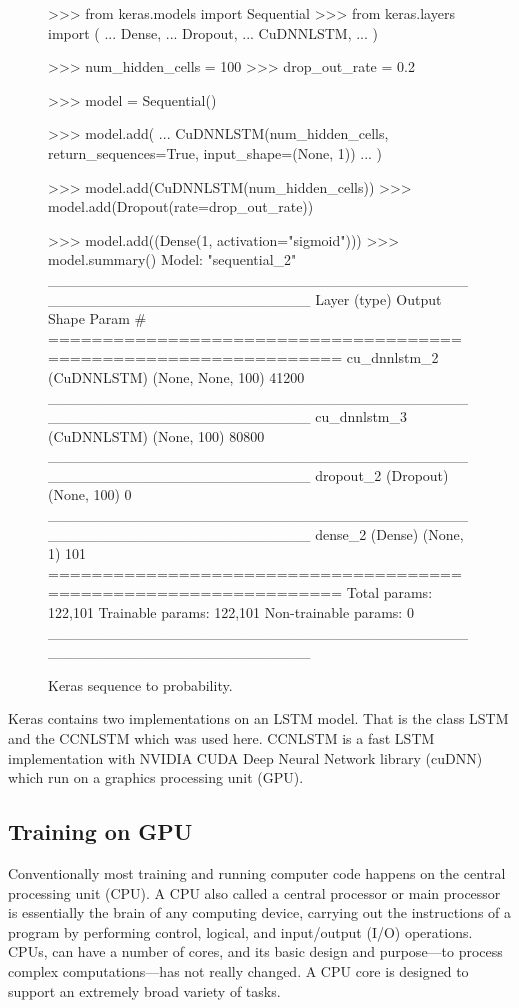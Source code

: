 \begin{figure}[!htbp]
\begin{usagepy}
    >>> from keras.models import Sequential
>>> from keras.layers import (
...     Dense,
...     Dropout,
...     CuDNNLSTM,
... )

>>> num_hidden_cells = 100
>>> drop_out_rate = 0.2

>>> model = Sequential()

>>> model.add(
...     CuDNNLSTM(num_hidden_cells, return_sequences=True, input_shape=(None, 1))
... )

>>> model.add(CuDNNLSTM(num_hidden_cells))
>>> model.add(Dropout(rate=drop_out_rate))

>>> model.add((Dense(1, activation="sigmoid")))
>>> model.summary()
Model: "sequential_2"
_________________________________________________________________
Layer (type)                 Output Shape              Param #   
=================================================================
cu_dnnlstm_2 (CuDNNLSTM)     (None, None, 100)         41200     
_________________________________________________________________
cu_dnnlstm_3 (CuDNNLSTM)     (None, 100)               80800     
_________________________________________________________________
dropout_2 (Dropout)          (None, 100)               0         
_________________________________________________________________
dense_2 (Dense)              (None, 1)                 101       
=================================================================
Total params: 122,101
Trainable params: 122,101
Non-trainable params: 0
_________________________________________________________________

\end{usagepy}
\caption{Keras sequence to probability.}\label{fig:keras_sequence_to_probability}
\end{figure}

Keras contains two implementations on an LSTM model. That is the class LSTM and
the CCNLSTM which was used here. CCNLSTM is a fast  LSTM implementation with
NVIDIA CUDA Deep Neural Network library (cuDNN) which run on a graphics
processing unit (GPU).

\subsection{Training on GPU}

Conventionally most training and running computer code happens on the central
processing unit (CPU). A CPU also called a central processor or main processor
is essentially the brain of any computing device, carrying out the instructions
of a program by performing control, logical, and input/output (I/O) operations.
CPUs, can have a number of cores, and its basic design and purpose—to process
complex computations—has not really changed. A CPU core is designed to support
an extremely broad variety of tasks.

